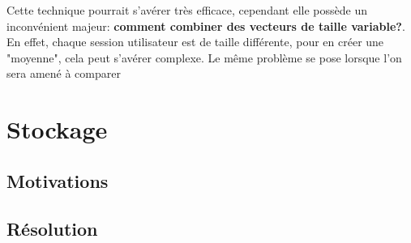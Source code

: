             Cette technique pourrait s'avérer très efficace, cependant elle possède un inconvénient majeur: \textbf{comment combiner des vecteurs de taille variable?}.\\
            En effet, chaque session utilisateur est de taille différente, pour en créer une "moyenne", cela peut s'avérer complexe. Le même problème se pose lorsque l'on sera amené à comparer 


    \section{Stockage}
        \subsection{Motivations}
        \subsection{Résolution}
